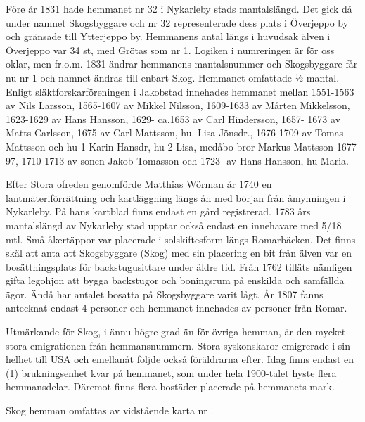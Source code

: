 
Före år 1831 hade hemmanet nr 32 i Nykarleby stads mantalslängd. Det gick då under namnet Skogsbyggare och nr 32 representerade dess plats i Överjeppo by och gränsade till Ytterjeppo by. Hemmanens antal längs i huvudsak älven i Överjeppo var 34 st, med Grötas som nr 1. Logiken i numreringen är för oss oklar, men fr.o.m. 1831 ändrar hemmanens mantalsnummer och Skogsbyggare får nu nr 1 och namnet ändras till enbart Skog. Hemmanet omfattade ½ mantal. Enligt släktforskarföreningen i Jakobstad innehades hemmanet mellan 1551-1563 av Nils Larsson, 1565-1607 av Mikkel Nilsson, 1609-1633 av Mårten Mikkelsson, 1623-1629 av Hans Hansson, 1629- ca.1653 av Carl Hindersson, 1657- 1673 av Matts Carlsson, 1675 av  Carl Mattsson, hu. Lisa Jönsdr., 1676-1709 av Tomas Mattsson och hu 1 Karin Hansdr, hu 2 Lisa, medåbo bror Markus Mattsson 1677-97, 1710-1713 av sonen Jakob Tomasson och 1723- av Hans Hansson, hu Maria.

Efter Stora ofreden genomförde Matthias Wörman år 1740 en lantmäteriförrättning och kartläggning längs ån med början från åmynningen i Nykarleby. På hans kartblad finns endast en gård registrerad. 1783 års mantalslängd av Nykarleby stad upptar också endast en innehavare med 5/18 mtl. Små åkertäppor var placerade i solskiftesform längs Romarbäcken. Det finns skäl att anta att Skogsbyggare (Skog) med sin placering en bit från älven var en bosättningsplats för backstugusittare under äldre tid. Från 1762 tilläts nämligen gifta legohjon att bygga backstugor och boningsrum på enskilda och samfällda ägor. Ändå har antalet bosatta på Skogsbyggare varit lågt. År 1807 fanns antecknat endast 4 personer och hemmanet innehades av personer från Romar.

Utmärkande för Skog, i ännu högre grad än för övriga hemman, är den mycket stora emigrationen från hemmansnummern. Stora syskonskaror emigrerade i sin helhet till USA och emellanåt följde också föräldrarna efter. Idag finns endast en (1) brukningsenhet kvar på hemmanet, som under hela 1900-talet hyste flera hemmansdelar. Däremot finns flera bostäder placerade på hemmanets mark.

Skog hemman omfattas av vidstående karta nr .







